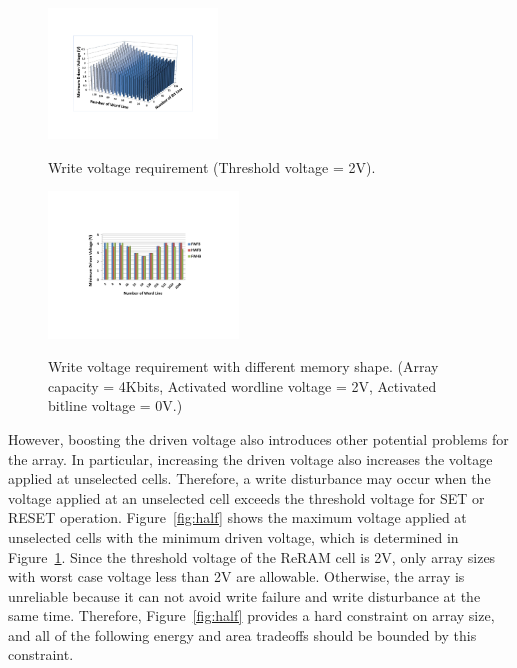\begin{figure}%
\centering
  \includegraphics[width=0.4\textwidth]{./figures/worst_v3.pdf}\\
  \caption{Write voltage requirement (Threshold voltage = 2V). }\label{fig:worst_v}
  \vspace{-10pt}
\end{figure}


\begin{figure}%
\centering
  \includegraphics[width=0.45\textwidth]{./figures/shape3.pdf}\\
  \caption{Write voltage requirement with different memory shape. (Array capacity = 4Kbits, Activated wordline voltage = 2V, Activated bitline voltage = 0V.)}\label{fig:shape}
    \vspace{-10pt}
\end{figure}

However, boosting the driven voltage also introduces other potential problems for the array. In particular, increasing the driven voltage also increases the voltage applied at unselected cells. Therefore, a
write disturbance may occur when the voltage applied at an unselected cell exceeds the threshold voltage for SET or RESET operation. Figure~\ref{fig:half} shows the maximum voltage applied at
unselected cells with the minimum driven voltage, which is determined in
Figure~\ref{fig:worst_v}. Since the threshold voltage of the ReRAM cell is 2V, only array sizes with worst case voltage less than 2V are allowable. Otherwise, the array is unreliable because it can not avoid write failure and write disturbance at the same time. Therefore, Figure~\ref{fig:half} provides a hard constraint on array size, and all of the following energy and area tradeoffs should be bounded by this constraint.

